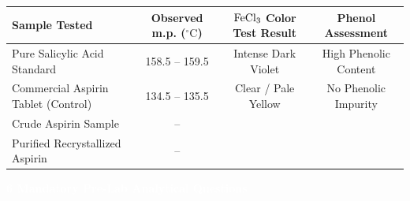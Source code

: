 \documentclass[10pt,a4paper]{article}
\newcommand{\labsection}[2]{%
  \vspace{0.25cm}%
  \begin{tcolorbox}[
    enhanced,
    colback=NavyDark,
    colframe=NavyDark,
    arc=3pt,
    boxrule=0pt,
    left=8pt, right=8pt, top=3pt, bottom=3pt
  ]
    \textcolor{white}{\bfseries\small #1 \quad #2}
  \end{tcolorbox}%
  \vspace{0.05cm}%
}
\begin{document}
\begin{tcolorbox}[
  enhanced,
  colback=white,
  colframe=BorderGray,
  boxrule=0.5pt,
  arc=3pt,
  left=8pt, right=8pt, top=6pt, bottom=6pt
]
\begin{tabularx}{\textwidth}{|X|c|c|c|}
  \hline
  \rowcolor{NavyDark}
  \color{white}\textbf{Sample Tested} & \color{white}\textbf{Observed m.p. ($^\circ\text{C}$)} & \color{white}\textbf{$\ce{FeCl3}$ Color Test Result} & \color{white}\textbf{Phenol Assessment} \\
  \hline
  Pure Salicylic Acid Standard & 158.5 -- 159.5 & Intense Dark Violet & High Phenolic Content \\
  \hline
  Commercial Aspirin Tablet (Control) & 134.5 -- 135.5 & Clear / Pale Yellow & No Phenolic Impurity \\
  \hline
  Crude Aspirin Sample & \hspace{1.5cm} -- \hspace{1.5cm} & & \\
  \hline
  Purified Recrystallized Aspirin & \hspace{1.5cm} -- \hspace{1.5cm} & & \\
  \hline
\end{tabularx}
\end{tcolorbox}

\pagebreak

\labsection{6}{Mandatory Pre-Lab Analytical Questions}
\end{document}
